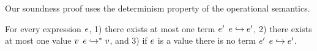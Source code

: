 


  
%
Our soundness proof  uses the determinism 
property of the operational semantics.
%
\begin{lemma}[Determinism]\label{lem:step-determ}
For every expression $e$, 
    1) there exists at most one term $e'$ \suchthat $e \hookrightarrow e'$, 
    2) there exists at most one value $v$ \suchthat ${e} \hookrightarrow^{*} {v}$, and
    3) if $e$ is a value there is no term $e'$ \suchthat $e \hookrightarrow e'$.
\end{lemma}    
